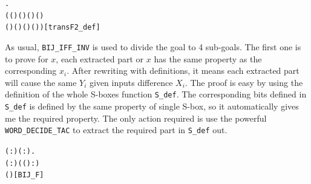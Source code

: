 \documentclass{article}
\begin{document}
\begin{alltt}
\HOLTokenTurnstile{} \HOLSymConst{\HOLTokenForall{}}.   \HOLSymConst{=}
       (( \HOLSymConst{\HOLTokenExtract{}} ) \HOLSymConst{,}( \HOLSymConst{\HOLTokenExtract{}} ) \HOLSymConst{,}( \HOLSymConst{\HOLTokenExtract{}} ) \HOLSymConst{,}( \HOLSymConst{\HOLTokenExtract{}} ) \HOLSymConst{,}
        ( \HOLSymConst{\HOLTokenExtract{}} ) \HOLSymConst{,}( \HOLSymConst{\HOLTokenExtract{}} ) \HOLSymConst{,}( \HOLSymConst{\HOLTokenExtract{}} ) \HOLSymConst{,}( \HOLSymConst{\HOLTokenExtract{}} ) )\hfill{[transF2_def]}
\end{alltt}

As usual, \verb|BIJ_IFF_INV| is used to divide the goal to 4 sub-goals. The first one is to prove for $x$, each extracted part or $x$
has the same property as the corresponding $x_i$. After rewriting with definitions, it means each extracted part will cause the same
$Y_i$ given inputs difference $X_i$. The proof is easy by using the definition of the whole S-boxes function
\verb|S_def|. The corresponding bits defined in \verb|S_def| is defined by the same property of single S-box, so it automatically gives me
the required property. The only action required is use the powerful \verb|WORD_DECIDE_TAC| to extract the required part in \verb|S_def| out.

\begin{alltt}
\HOLTokenTurnstile{} \HOLSymConst{\HOLTokenForall{}}( :) ( :).
      
       \HOLTokenLeftbrace{} \HOLTokenBar{} (  :) \HOLSymConst{\HOLTokenEor{}} ( ( \HOLSymConst{\HOLTokenEor{}}  ) :) \HOLSymConst{=} \HOLTokenRightbrace{}
       (  )\hfill{[BIJ_F]}
\end{alltt}
\end{document}
